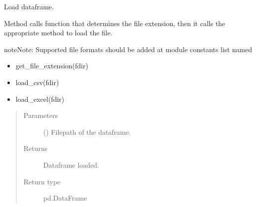 \documentclass[letterpaper,10pt,english]{sphinxmanual}
\begin{document}

\begin{fulllineitems}
\label{\detokenize{source/optimization.opt_tools:optimization.opt_tools.load_data.load_data}}
Load dataframe.

Method calls function that determines the file extension,
then it calls the appropriate method to load the file.

\begin{sphinxadmonition}{note}{Note:}
Supported file formats should be added at module constants list named

\begin{itemize}
\item {} 
get\_file\_extension(fdir)

\item {} 
load\_csv(fdir)

\item {} 
load\_excel(fdir)

\end{itemize}
\end{sphinxadmonition}
\begin{quote}\begin{description}
\item[{Parameters}] \leavevmode
{} () \textendash{} Filepath of the dataframe.

\item[{Returns}] \leavevmode
{} \textendash{} Dataframe loaded.

\item[{Return type}] \leavevmode
pd.DataFrame

\end{description}\end{quote}

\end{fulllineitems}

\end{document}
